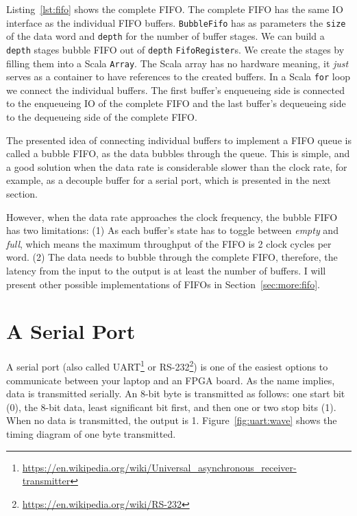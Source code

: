 \documentclass[%
    10pt,
    headinclude, footexclude,
    openright, %
    notitlepage,
    cleardoubleempty,
    headsepline,
    pointlessnumbers,
    bibtotoc, idxtotoc,
    ]{scrbook}
\newcommand{\code}[1]{{\small{\texttt{#1}}}}
\newcommand{\myref}[2]{\href{#1}{#2}}
\renewcommand{\myref}[2]{{#2}{\footnote{\url{#1}}}}
\begin{document}

Listing~\ref{lst:fifo} shows the complete FIFO. The complete FIFO has
the same IO interface as the individual FIFO buffers.
\code{BubbleFifo} has as parameters the \code{size} of the data
word and \code{depth} for the number of buffer stages.
We can build a \code{depth} stages bubble FIFO out of \code{depth}
\code{FifoRegister}s. We create the stages by filling them into a Scala \code{Array}.
The Scala array has no hardware meaning, it \emph{just} serves as
a container to have references to the created buffers.
In a Scala \code{for} loop we connect the individual buffers.
The first buffer's enqueueing side is connected to the enqueueing IO of
the complete FIFO and the last buffer's dequeueing side to the
dequeueing side of the complete FIFO.


The presented idea of connecting individual buffers to implement a FIFO
queue is called a bubble FIFO, as the data bubbles through the queue.
This is simple, and a good solution when the data rate is considerable slower
than the clock rate, for example, as a decouple buffer for a serial port, which is presented
in the next section.

However, when the data rate approaches the clock frequency, the bubble FIFO
has two limitations: (1) As each buffer's state has to toggle between \emph{empty} and
\emph{full}, which means the maximum throughput of the FIFO is 2 clock cycles
per word. (2) The data needs to bubble through the complete FIFO, therefore,
the latency from the input to the output is at least the number of buffers.
I will present other possible implementations of FIFOs in Section~\ref{sec:more:fifo}.

\section{A Serial Port}
\label{sec:uart}

A serial port (also called
\myref{https://en.wikipedia.org/wiki/Universal_asynchronous_receiver-transmitter}{UART}
or \myref{https://en.wikipedia.org/wiki/RS-232}{RS-232}) is one of the easiest options
to communicate between your laptop and an FPGA board.
As the name implies, data is transmitted serially. An 8-bit byte is transmitted as follows:
one start bit (0), the 8-bit data, least significant bit first, and then one or two stop
bits (1). When no data is transmitted, the output is 1.
Figure~\ref{fig:uart:wave} shows the timing diagram of one byte transmitted.
\end{document}
